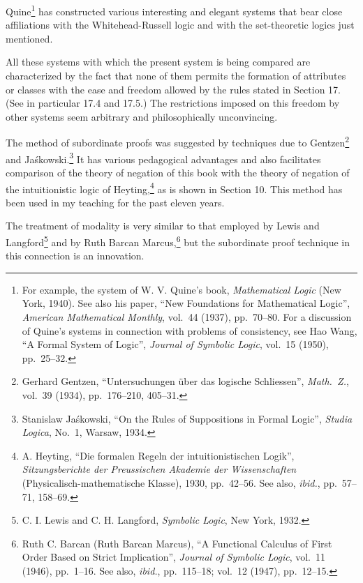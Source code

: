 \documentclass{book}
\begin{document}
Quine\footnote{For example, the system of W. V. Quine's book, \textit{Mathematical Logic} (New York, 1940).  See also his paper, “New Foundations for Mathematical Logic”, \textit{American Mathematical Monthly}, vol.\ 44 (1937), pp.\ 70–80.  For a discussion of Quine's systems in connection with problems of consistency, see Hao Wang, “A Formal System of Logic”, \textit{Journal of Symbolic Logic}, vol.\ 15 (1950), pp.\ 25–32.} has constructed various interesting and elegant systems that bear close affiliations with the Whitehead-Russell logic and with the set-theoretic logics just mentioned.

All these systems with which the present system is being compared are characterized by the fact that none of them permits the formation of attributes or classes with the ease and freedom allowed by the rules stated in Section 17.  (See in particular 17.4 and 17.5.)  The restrictions imposed on this freedom by other systems seem arbitrary and philosophically unconvincing.

The method of subordinate proofs was suggested by techniques due to Gentzen\footnote{Gerhard Gentzen, “Untersuchungen über das logische Schliessen”, \textit{Math.\ Z.}, vol.\ 39 (1934), pp.\ 176–210, 405–31.} and Jaśkowski.\footnote{Stanislaw Jaśkowski, “On the Rules of Suppositions in Formal Logic”, \textit{Studia Logica}, No.\ 1, Warsaw, 1934.}  It has various pedagogical advantages and also facilitates comparison of the theory of negation of this book with the theory of negation of the intuitionistic logic of Heyting,\footnote{A. Heyting, “Die formalen Regeln der intuitionistischen Logik”, \textit{Sitzungsberichte der Preussischen Akademie der Wissenschaften} (Physicalisch-mathematische Klasse), 1930, pp.\ 42–56.  See also, \textit{ibid.}, pp.\ 57–71, 158–69.} as is shown in Section 10.  This method has been used in my teaching for the past eleven years.

The treatment of modality is very similar to that employed by Lewis and Langford\footnote{C. I. Lewis and C. H. Langford, \textit{Symbolic Logic}, New York, 1932.} and by Ruth Barcan Marcus,\footnote{Ruth C. Barcan (Ruth Barcan Marcus), “A Functional Calculus of First Order Based on Strict Implication”, \textit{Journal of Symbolic Logic}, vol.\ 11 (1946), pp.\ 1–16.  See also, \textit{ibid.}, pp.\ 115–18; vol.\ 12 (1947), pp.\ 12–15.} but the subordinate proof technique in this connection is an innovation.
\end{document}
